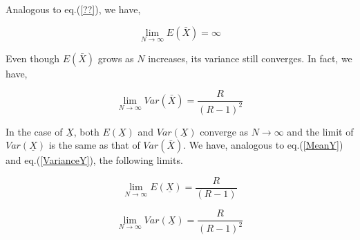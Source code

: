 \begin{multicols}{2}
Analogous to eq.(\ref{??}), we have,

\begin{thm}
 \label{thm-1}
\begin{equation*}
\lim_{N \rightarrow \infty} E(\bar{X}) = \infty
\end{equation*}
\end{thm}
Even though $E(\bar{X})$ grows as $N$ increases, its variance still converges. In fact, we have,\\ 
 \begin{thm}
 \label{thm-2}
\begin{equation*}
\lim_{N \rightarrow \infty} Var(\bar{X}) = \frac{R}{(R-1)^2}
\end{equation*}
 \end{thm}

\vspace{-.2cm} 
 
In the case of $\underline{X} $, both $E(\underline{X})$ and $Var(\underline{X})$ converge as $N \rightarrow \infty$ and the limit of $Var(\underline{X})$ is the same as that of $Var(\bar{X})$. We have, analogous to eq.(\ref{MeanY}) and eq.(\ref{VarianceY}), the following limits.
\begin{thm}
 \label{thm-3}
\begin{equation}\nonumber
\lim_{N \rightarrow \infty} E(\underline{X}) = \frac{R}{(R-1)}
\end{equation}
 \end{thm}
 \begin{thm}
 \label{thm-4}
\begin{equation}\nonumber
\lim_{N \rightarrow \infty} Var(\underline{X}) = \frac{R}{(R-1)^2}
\end{equation}
 \end{thm}
 
 \vspace{-.3cm}
 

\end{multicols}
